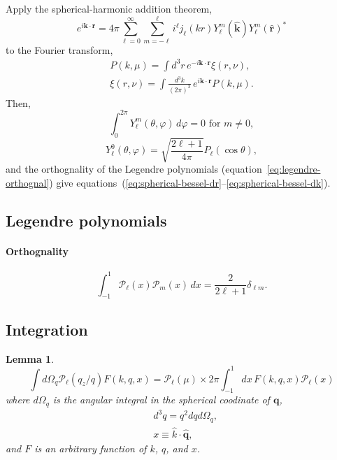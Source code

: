 \documentclass[a4paper,11pt, fleqn]{article}
\newtheorem{lemma}{Lemma}
\begin{document}
Apply the spherical-harmonic addition theorem,
%
\begin{equation}
  e^{i\bm{k}\cdot\bm{r}} = 4\pi \sum_{\ell=0}^\infty \sum_{m=-\ell}^\ell
  i^\ell j_\ell(kr) Y_\ell^m(\hat{\bm{k}}) Y_\ell^m(\hat{\bm{r}})^*
\end{equation}
%
to the Fourier transform,
%
\begin{align}
  P(k, \mu) = \int \!\! d^3 r \, e^{-i\bm{k}\cdot\bm{r}} \xi(r, \nu),\\
  \xi(r, \nu) = \int \!\! \frac{d^3 k}{(2\pi)^3} \, e^{i\bm{k}\cdot\bm{r}} P(k, \mu).
\end{align}
%
Then,
%
\begin{equation}
  \int_0^{2\pi} \! Y_\ell^m(\theta, \varphi) \, d \varphi = 0
  \mbox{ for $m \neq 0$},
\end{equation}
%
\begin{equation}
  Y_\ell^0(\theta, \varphi) = \sqrt{\frac{2\ell + 1}{4\pi}} P_\ell(\cos\theta),
\end{equation}
%
and the orthognality of the Legendre polynomials
(equation~\ref{eq:legendre-orthognal}) give
equations~(\ref{eq:spherical-bessel-dr}--\ref{eq:spherical-bessel-dk}).

\clearpage
\subsection{Legendre polynomials}
\label{sec:legendre}

\vspace{4mm}

\paragraph{Orthognality}
  
\begin{equation}
  \label{eq:legendre-orthognal}
  \int_{-1}^1 \mathcal{P}_\ell(x) \mathcal{P}_m(x) \, dx =
    \frac{2}{2\ell + 1} \delta_{\ell m}.
\end{equation}

\clearpage
\subsection{Integration}
\label{sec:integration}

\vspace{5mm}

\begin{lemma}
  \begin{equation}
    \label{eq:lemma-integral}
    \int \! d\Omega_q \mathcal{P}_\ell(q_z/q) F(k, q, x)
    = \mathcal{P}_\ell(\mu)
      \times 2\pi \int_{-1}^1 \! dx \, F(k, q, x) \mathcal{P}_\ell(x)
  \end{equation}
  where $d\Omega_q$ is the angular integral in the spherical coodinate
  of $\bm{q}$,
  \begin{align}
    &d^3 q = q^2 dq d\Omega_q,\\
    &x \equiv \hat{k}\cdot\hat{\bm{q}},
  \end{align}
  and $F$ is an arbitrary
  function of $k$, $q$, and $x$.
\end{lemma}
\end{document}

